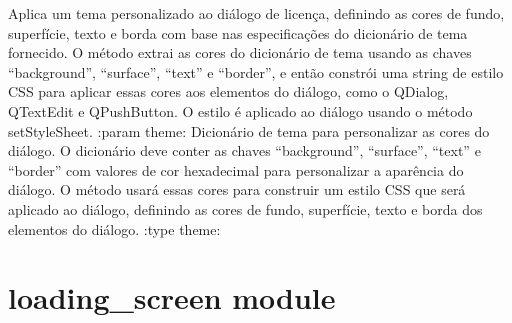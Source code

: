 \documentclass[letterpaper,10pt,english]{sphinxmanual}
\begin{document}
\begin{fulllineitems}
\begin{fulllineitems}
\label{\detokenize{api/license_dialog:license_dialog.LicenseDialog.apply_theme}}
\pysigstartsignatures
\pysiglinewithargsret
{}
{}
{}
\pysigstopsignatures
\sphinxAtStartPar
Aplica um tema personalizado ao diálogo de licença, definindo as cores de fundo, superfície, texto e borda com base nas especificações do dicionário de tema fornecido. O método extrai as cores do dicionário de tema usando as chaves “background”, “surface”, “text” e “border”, e então constrói uma string de estilo CSS para aplicar essas cores aos elementos do diálogo, como o QDialog, QTextEdit e QPushButton. O estilo é aplicado ao diálogo usando o método setStyleSheet.
:param theme: Dicionário de tema para personalizar as cores do diálogo. O dicionário deve conter as chaves “background”, “surface”, “text” e “border” com valores de cor hexadecimal para personalizar a aparência do diálogo. O método usará essas cores para construir um estilo CSS que será aplicado ao diálogo, definindo as cores de fundo, superfície, texto e borda dos elementos do diálogo.
:type theme: 
\begin{quote}\begin{description}
\sphinxAtStartPar
{}

\end{description}\end{quote}

\end{fulllineitems}


\end{fulllineitems}


\sphinxstepscope


\section{loading\_screen module}
\label{\detokenize{api/loading_screen:module-loading_screen}}\label{\detokenize{api/loading_screen:loading-screen-module}}\label{\detokenize{api/loading_screen::doc}}
\end{document}
